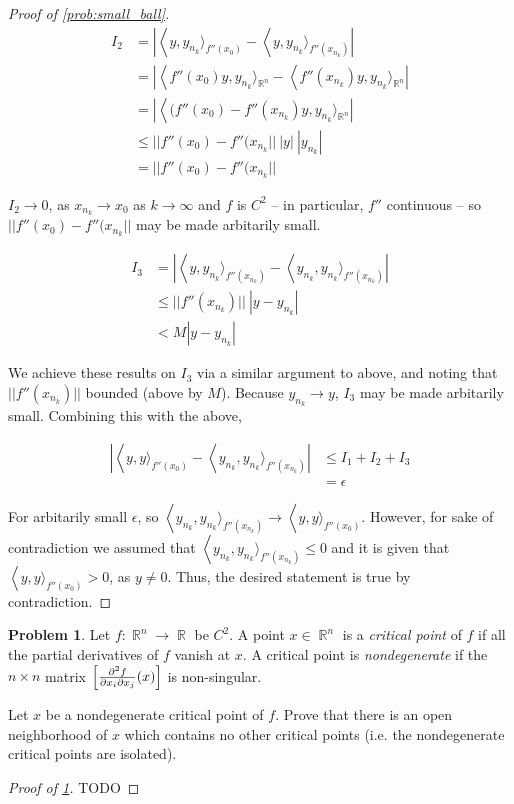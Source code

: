 \documentclass[english]{article}
\DeclareMathOperator{\R}{\mathbb{R}}
\DeclareMathOperator{\<}{\langle}
\renewcommand{\>}{\rangle}
\theoremstyle{definition}
\newtheorem{problem}[theorem]{Problem}
\begin{document}
\begin{proof}[Proof of \cref{prob:small_ball}]
    \begin{align*}
        I_2
        & = |\< y, y_{n_k}\>_{f''(x_0)} - \<y,y_{n_k}\>_{f''(x_{n_k})}| \\
        & = |\<f''(x_0)y, y_{n_k}\>_{\R^n} - \< f''(x_{n_k})y, y_{n_k} \>_{\R^n}| \\
        & = |\< (f''(x_0) - f''(x_{n_k})y, y_{n_k} \>_{\R^n}| \\
        & \leq ||f''(x_0) - f''(x_{n_k}|| \ |y|\ |y_{n_k}| \\
        & = ||f''(x_0) - f''(x_{n_k}||
    \end{align*}

    $I_2 \to 0$, as $x_{n_k} \to x_0$ as $k \to \infty$ and $f$ is $C^2$ -- in particular, $f''$ continuous -- so $||f''(x_0) - f''(x_{n_k}||$ may be made arbitarily small. 

    \begin{align*}
        I_3 
        & = |\< y, y_{n_k}\>_{f''(x_{n_k})} - \<y_{n_k},y_{n_k}\>_{f''(x_{n_k})}| \\
        & \leq ||f''(x_{n_k})|| \ |y - y_{n_k}| \\
        & < M |y - y_{n_k}|
    \end{align*}

    We achieve these results on $I_3$ via a similar argument to above, and noting that $||f''(x_{n_k})||$ bounded (above by $M$). Because $y_{n_k} \to y$, $I_3$ may be made arbitarily small. Combining this with the above, 

    \begin{align*}
        |\< y, y\>_{f''(x_0)} - \<y_{n_k},y_{n_k}\>_{f''(x_{n_k})}|
        & \leq I_1 + I_2 + I_3 \\
        & = \epsilon
    \end{align*}

    For arbitarily small $\epsilon$, so $\<y_{n_k},y_{n_k}\>_{f''(x_{n_k})} \to \< y, y\>_{f''(x_0)}$. However, for sake of contradiction we assumed that $\<y_{n_k},y_{n_k}\>_{f''(x_{n_k})} \leq 0$ and it is given that $\< y, y\>_{f''(x_0)} > 0$, as $y \neq 0$. Thus, the desired statement is true by contradiction.

\end{proof}

\begin{problem}
    \label{prob:nondeg}
    Let $f: \R^n \to \R$ be $C^2$. A point $x \in \R^n$ is a \textit{critical point} of $f$ if all the partial derivatives of $f$ vanish at $x$. A critical point is \textit{nondegenerate} if the $n \times n$ matrix $\left[ {\partial^2 f \over \partial x_i \partial x_j } (x) \right]$ is non-singular. 

    Let $x$ be a nondegenerate critical point of $f$. Prove that there is an open neighborhood of $x$ which contains no other critical points (i.e. the nondegenerate critical points are isolated).
    
    \begin{proof}[Proof of \cref{prob:nondeg}]
        TODO
    \end{proof}
\end{problem}
\end{document}
